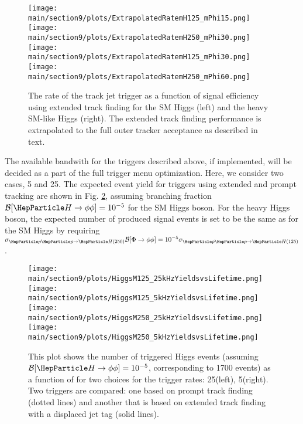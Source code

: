 \begin{figure}[hbtp]
  \centering
    \texttt{[image: \\main/section9/plots/ExtrapolatedRatemH125\_mPhi15.png]}
    \texttt{[image: \\main/section9/plots/ExtrapolatedRatemH250\_mPhi30.png]}\\
    \texttt{[image: \\main/section9/plots/ExtrapolatedRatemH125\_mPhi30.png]}
    \texttt{[image: \\main/section9/plots/ExtrapolatedRatemH250\_mPhi60.png]}
    \caption{The rate of the track jet \HT trigger as a function of signal efficiency using extended track finding for the SM Higgs (left)
    and the heavy SM-like Higgs (right). The extended track finding performance is extrapolated to the full outer tracker acceptance as described in text.}
    \label{fig:reff_dispextra}
\end{figure}

The available bandwith for the triggers described above, if implemented, will be decided as a part of the full trigger menu optimization.
Here, we consider two cases, 5 and 25\UkHz. The expected event yield for triggers using extended and prompt tracking are shown in Fig. \ref{fig:money},
assuming branching fraction $\mathcal{B}[\Hphiphi] = 10^{-5}$ for the SM Higgs boson.
For the heavy Higgs boson, the expected number of produced signal events is set to be the same as for the SM Higgs by requiring
$\sigma_{\pp\to \PH(250)} \mathcal{B}[\BSMHphiphi] = 10^{-5} \sigma_{\pp\to \PH(125)}$.

\begin{figure}[hbtp]
  \centering
    \texttt{[image: \\main/section9/plots/HiggsM125\_25kHzYieldsvsLifetime.png]}
    \texttt{[image: \\main/section9/plots/HiggsM125\_5kHzYieldsvsLifetime.png]}\\
    \texttt{[image: \\main/section9/plots/HiggsM250\_25kHzYieldsvsLifetime.png]}
    \texttt{[image: \\main/section9/plots/HiggsM250\_5kHzYieldsvsLifetime.png]}
    \caption{This plot shows the number of triggered Higgs events (assuming ${\mathcal{B}[\Hphiphi] = 10^{-5}}$, corresponding to 
1700 events) as a function of \ctau for two choices for the trigger rates: 25\UkHz (left), 5\UkHz (right).
Two triggers are compared: one based on prompt track finding (dotted lines) and another that is based on extended track finding 
with a displaced jet tag (solid lines). }
    \label{fig:money}
\end{figure}

